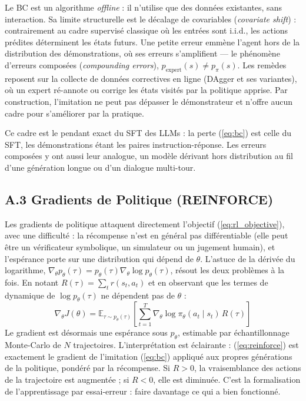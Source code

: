 \documentclass[11pt,a4paper]{article}
\begin{document}
Le BC est un algorithme \emph{offline} : il n'utilise que des données existantes, sans interaction. Sa limite structurelle est le décalage de covariables (\emph{covariate shift}) : contrairement au cadre supervisé classique où les entrées sont i.i.d., les actions prédites déterminent les états futurs. Une petite erreur emmène l'agent hors de la distribution des démonstrations, où ses erreurs s'amplifient — le phénomène d'erreurs composées (\emph{compounding errors}), $p_{\text{expert}}(s) \neq p_\pi(s)$. Les remèdes reposent sur la collecte de données correctives en ligne (DAgger et ses variantes), où un expert ré-annote ou corrige les états visités par la politique apprise. Par construction, l'imitation ne peut pas dépasser le démonstrateur et n'offre aucun cadre pour s'améliorer par la pratique.

Ce cadre est le pendant exact du SFT des LLMs : la perte (\ref{eq:bc}) est celle du SFT, les démonstrations étant les paires instruction-réponse. Les erreurs composées y ont aussi leur analogue, un modèle dérivant hors distribution au fil d'une génération longue ou d'un dialogue multi-tour.

\subsection*{A.3 Gradients de Politique (REINFORCE)}
Les gradients de politique attaquent directement l'objectif (\ref{eq:rl_objective}), avec une difficulté : la récompense n'est en général pas différentiable (elle peut être un vérificateur symbolique, un simulateur ou un jugement humain), et l'espérance porte sur une distribution qui dépend de $\theta$. L'astuce de la dérivée du logarithme, $\nabla_\theta p_\theta(\tau) = p_\theta(\tau) \nabla_\theta \log p_\theta(\tau)$, résout les deux problèmes à la fois. En notant $R(\tau) = \sum_t r(s_t, a_t)$ et en observant que les termes de dynamique de $\log p_\theta(\tau)$ ne dépendent pas de $\theta$ :
\begin{equation}
\nabla_\theta J(\theta) = \mathbb{E}_{\tau \sim p_\theta(\tau)} \left[ \sum_{t=1}^{T} \nabla_\theta \log \pi_\theta(a_t \mid s_t) \, R(\tau) \right]
\label{eq:reinforce}
\end{equation}
Le gradient est désormais une espérance sous $p_\theta$, estimable par échantillonnage Monte-Carlo de $N$ trajectoires. L'interprétation est éclairante : (\ref{eq:reinforce}) est exactement le gradient de l'imitation (\ref{eq:bc}) appliqué aux propres générations de la politique, pondéré par la récompense. Si $R > 0$, la vraisemblance des actions de la trajectoire est augmentée ; si $R < 0$, elle est diminuée. C'est la formalisation de l'apprentissage par essai-erreur : faire davantage ce qui a bien fonctionné.
\end{document}
